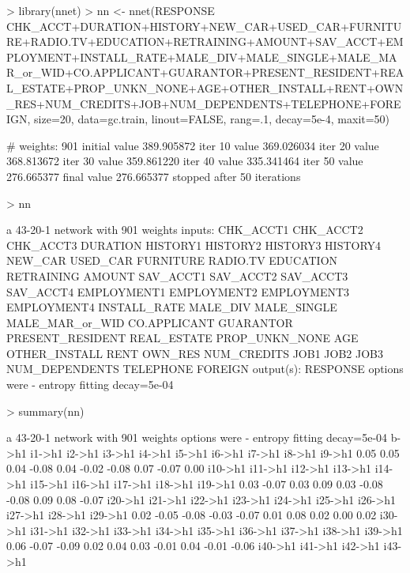 \documentclass{article}
\begin{document}
\begin{Schunk}
\begin{Sinput}
> library(nnet)
> nn <- nnet(RESPONSE ~ CHK_ACCT+DURATION+HISTORY+NEW_CAR+USED_CAR+FURNITURE+RADIO.TV+EDUCATION+RETRAINING+AMOUNT+SAV_ACCT+EMPLOYMENT+INSTALL_RATE+MALE_DIV+MALE_SINGLE+MALE_MAR_or_WID+CO.APPLICANT+GUARANTOR+PRESENT_RESIDENT+REAL_ESTATE+PROP_UNKN_NONE+AGE+OTHER_INSTALL+RENT+OWN_RES+NUM_CREDITS+JOB+NUM_DEPENDENTS+TELEPHONE+FOREIGN, size=20, data=gc.train, linout=FALSE, rang=.1, decay=5e-4, maxit=50)
\end{Sinput}
\begin{Soutput}
# weights:  901
initial  value 389.905872 
iter  10 value 369.026034
iter  20 value 368.813672
iter  30 value 359.861220
iter  40 value 335.341464
iter  50 value 276.665377
final  value 276.665377 
stopped after 50 iterations
\end{Soutput}
\begin{Sinput}
> nn
\end{Sinput}
\begin{Soutput}
a 43-20-1 network with 901 weights
inputs: CHK_ACCT1 CHK_ACCT2 CHK_ACCT3 DURATION HISTORY1 HISTORY2 HISTORY3 HISTORY4 NEW_CAR USED_CAR FURNITURE RADIO.TV EDUCATION RETRAINING AMOUNT SAV_ACCT1 SAV_ACCT2 SAV_ACCT3 SAV_ACCT4 EMPLOYMENT1 EMPLOYMENT2 EMPLOYMENT3 EMPLOYMENT4 INSTALL_RATE MALE_DIV MALE_SINGLE MALE_MAR_or_WID CO.APPLICANT GUARANTOR PRESENT_RESIDENT REAL_ESTATE PROP_UNKN_NONE AGE OTHER_INSTALL RENT OWN_RES NUM_CREDITS JOB1 JOB2 JOB3 NUM_DEPENDENTS TELEPHONE FOREIGN 
output(s): RESPONSE 
options were - entropy fitting  decay=5e-04
\end{Soutput}
\begin{Sinput}
> summary(nn)
\end{Sinput}
\begin{Soutput}
a 43-20-1 network with 901 weights
options were - entropy fitting  decay=5e-04
  b->h1  i1->h1  i2->h1  i3->h1  i4->h1  i5->h1  i6->h1  i7->h1  i8->h1  i9->h1 
   0.05    0.05    0.04   -0.08    0.04   -0.02   -0.08    0.07   -0.07    0.00 
i10->h1 i11->h1 i12->h1 i13->h1 i14->h1 i15->h1 i16->h1 i17->h1 i18->h1 i19->h1 
   0.03   -0.07    0.03    0.09    0.03   -0.08   -0.08    0.09    0.08   -0.07 
i20->h1 i21->h1 i22->h1 i23->h1 i24->h1 i25->h1 i26->h1 i27->h1 i28->h1 i29->h1 
   0.02   -0.05   -0.08   -0.03   -0.07    0.01    0.08    0.02    0.00    0.02 
i30->h1 i31->h1 i32->h1 i33->h1 i34->h1 i35->h1 i36->h1 i37->h1 i38->h1 i39->h1 
   0.06   -0.07   -0.09    0.02    0.04    0.03   -0.01    0.04   -0.01   -0.06 
i40->h1 i41->h1 i42->h1 i43->h1 

\end{Soutput}
\end{Schunk}
\end{document}
